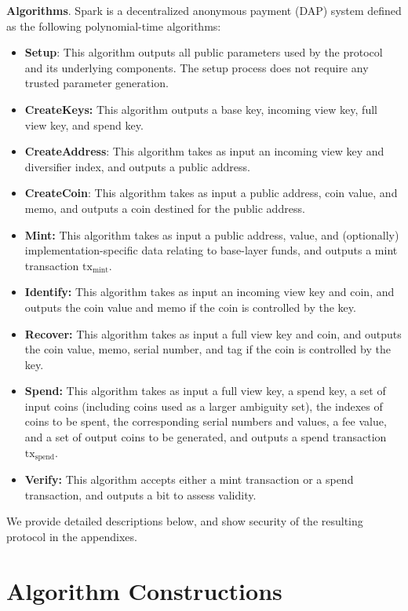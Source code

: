 \documentclass{llncs}
\begin{document}
\textbf{Algorithms}. Spark is a decentralized anonymous payment (DAP) system defined as the following polynomial-time algorithms:
\begin{itemize}
\item \textbf{Setup}: This algorithm outputs all public parameters used by the protocol and its underlying components.
The setup process does not require any trusted parameter generation.
\item \textbf{CreateKeys:} This algorithm outputs a base key, incoming view key, full view key, and spend key.
\item \textbf{CreateAddress}: This algorithm takes as input an incoming view key and diversifier index, and outputs a public address.
\item \textbf{CreateCoin}: This algorithm takes as input a public address, coin value, and memo, and outputs a coin destined for the public address.
\item \textbf{Mint:} This algorithm takes as input a public address, value, and (optionally) implementation-specific data relating to base-layer funds, and outputs a mint transaction $\text{tx}_{\text{mint}}$.
\item \textbf{Identify:} This algorithm takes as input an incoming view key and coin, and outputs the coin value and memo if the coin is controlled by the key.
\item \textbf{Recover:} This algorithm takes as input a full view key and coin, and outputs the coin value, memo, serial number, and tag if the coin is controlled by the key.
\item \textbf{Spend:} This algorithm takes as input a full view key, a spend key, a set of input coins (including coins used as a larger ambiguity set), the indexes of coins to be spent, the corresponding serial numbers and values, a fee value, and a set of output coins to be generated, and outputs a spend transaction $\text{tx}_{\text{spend}}$.
\item \textbf{Verify:} This algorithm accepts either a mint transaction or a spend transaction, and outputs a bit to assess validity.
\end{itemize}

We provide detailed descriptions below, and show security of the resulting protocol in the appendixes.


\section{Algorithm Constructions}
\end{document}
